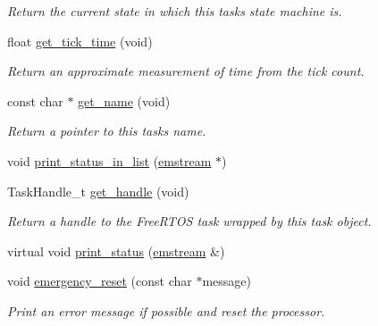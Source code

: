 \begin{DoxyCompactItemize}
\begin{DoxyCompactList}\small\item\em Return the current state in which this task\textquotesingle{}s state machine is. \end{DoxyCompactList}\item 
float \mbox{\hyperlink{class_task_base_a4d0769068c3095d76752e0a00963d8b8}{get\+\_\+tick\+\_\+time}} (void)
\begin{DoxyCompactList}\small\item\em Return an approximate measurement of time from the tick count. \end{DoxyCompactList}\item 
const char $\ast$ \mbox{\hyperlink{class_task_base_a69b0a4031cf715d9d3a6ecd3b29f5cbe}{get\+\_\+name}} (void)
\begin{DoxyCompactList}\small\item\em Return a pointer to this task\textquotesingle{}s name. \end{DoxyCompactList}\item 
void \mbox{\hyperlink{class_task_base_a58bd479a964b4c98da9f8f1a6b08efd7}{print\+\_\+status\+\_\+in\+\_\+list}} (\mbox{\hyperlink{classemstream}{emstream}} $\ast$)
\item 
Task\+Handle\+\_\+t \mbox{\hyperlink{class_task_base_a2113de68c720fcf8b643b11a43b84ab7}{get\+\_\+handle}} (void)
\begin{DoxyCompactList}\small\item\em Return a handle to the Free\+R\+T\+OS task wrapped by this task object. \end{DoxyCompactList}\item 
virtual void \mbox{\hyperlink{class_task_base_aea504e1e3d38a7e8e8c65c4284d4a560}{print\+\_\+status}} (\mbox{\hyperlink{classemstream}{emstream}} \&)
\item 
void \mbox{\hyperlink{class_task_base_a5842a497b5a274e6a40fae18bff03a9f}{emergency\+\_\+reset}} (const char $\ast$message)
\begin{DoxyCompactList}\small\item\em Print an error message if possible and reset the processor. \end{DoxyCompactList}\end{DoxyCompactItemize}
